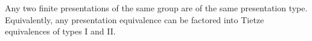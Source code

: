 Any two finite presentations of the same group are of the same presentation type. Equivalently, any presentation equivalence can be factored into Tietze equivalences of types I and II.
